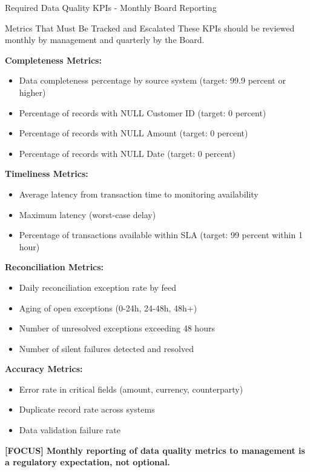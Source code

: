\documentclass[11pt,a4paper]{beamer}
\newcommand{\examfocus}[1]{\textcolor{orange!80!black}{\textbf{[FOCUS] #1}}}
\begin{document}
	\begin{frame}{Required Data Quality KPIs - Monthly Board Reporting}
		\begin{block}{Metrics That Must Be Tracked and Escalated}
			These KPIs should be reviewed monthly by management and quarterly by the Board.
		\end{block}
		
		\textbf{Completeness Metrics:}
		\begin{itemize}
			\item Data completeness percentage by source system (target: 99.9 percent or higher)
			\item Percentage of records with NULL Customer ID (target: 0 percent)
			\item Percentage of records with NULL Amount (target: 0 percent)
			\item Percentage of records with NULL Date (target: 0 percent)
		\end{itemize}
		
		\textbf{Timeliness Metrics:}
		\begin{itemize}
			\item Average latency from transaction time to monitoring availability
			\item Maximum latency (worst-case delay)
			\item Percentage of transactions available within SLA (target: 99 percent within 1 hour)
		\end{itemize}
		
		\textbf{Reconciliation Metrics:}
		\begin{itemize}
			\item Daily reconciliation exception rate by feed
			\item Aging of open exceptions (0-24h, 24-48h, 48h+)
			\item Number of unresolved exceptions exceeding 48 hours
			\item Number of silent failures detected and resolved
		\end{itemize}
		
		\textbf{Accuracy Metrics:}
		\begin{itemize}
			\item Error rate in critical fields (amount, currency, counterparty)
			\item Duplicate record rate across systems
			\item Data validation failure rate
		\end{itemize}
		
		\examfocus{Monthly reporting of data quality metrics to management is a regulatory expectation, not optional.}
	\end{frame}
	
\end{document}
